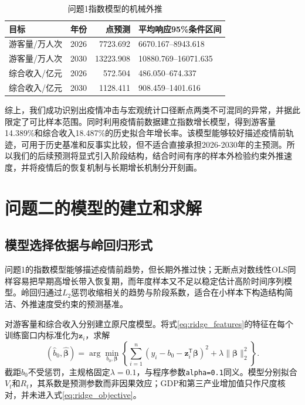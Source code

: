 \documentclass[withoutpreface,bwprint]{cumcmthesis}
\begin{document}
\begin{table}[H]
\centering
\caption{问题1指数模型的机械外推}
\label{tab:q1_mechanical_forecast}
\small
\renewcommand{\arraystretch}{1.08}
\begin{tabularx}{\textwidth}{p{3.2cm}c r X}
\toprule
目标 & 年份 & 点预测 & 平均响应95\%条件区间 \\
\midrule
游客量/万人次 & 2026 & 7723.692 & 6670.167--8943.618 \\
游客量/万人次 & 2030 & 13223.908 & 10880.769--16071.635 \\
综合收入/亿元 & 2026 & 572.504 & 486.050--674.337 \\
综合收入/亿元 & 2030 & 1128.411 & 908.459--1401.616 \\
\bottomrule
\end{tabularx}
\end{table}

综上，我们成功识别出疫情冲击与宏观统计口径断点两类不可混同的异常，并据此限定了可比样本范围。同时利用疫情前数据建立指数增长模型，得到游客量14.389\%和综合收入18.487\%的历史拟合年增长率。该模型能够较好描述疫情前轨迹，可用于历史基准和反事实比较，但不适合直接承担2026-2030年的主预测。所以我们的后续预测将显式引入阶段结构，结合时间有序的样本外检验约束外推速度，并将疫情后的恢复机制与长期增长机制分开刻画。


\section{问题二的模型的建立和求解}

\subsection{模型选择依据与岭回归形式}

问题1的指数模型能够描述疫情前趋势，但长期外推过快；无断点对数线性OLS同样容易把早期高增长带入恢复期，而年度样本又不足以稳定估计高阶时间序列模型。岭回归通过$L_2$惩罚收缩相关的趋势与阶段系数\cite{hoerl1970ridge}，适合在小样本下构造结构简洁、外推速度受约束的预测基准。

对游客量和综合收入分别建立原尺度模型。将式\eqref{eq:ridge_features}的特征在每个训练窗口内标准化为$\boldsymbol{z}_i$，求解
\begin{equation}
(\widehat b_0,\widehat{\boldsymbol\beta})
=\arg\min_{b_0,\boldsymbol\beta}
\left\{
\sum_{i=1}^{n}
\left(y_i-b_0-\boldsymbol z_i^{\mathsf T}\boldsymbol\beta\right)^2
+\lambda\lVert\boldsymbol\beta\rVert_2^2
\right\}.
\label{eq:ridge_objective}
\end{equation}
截距$b_0$不受惩罚，主规格固定$\lambda=0.1$，与程序参数\texttt{alpha=0.1}同义。模型分别拟合$V_t$和$R_t$，其系数是预测参数而非因果效应；GDP和第三产业增加值只作尺度核对，并未进入式\eqref{eq:ridge_objective}。
\end{document}
